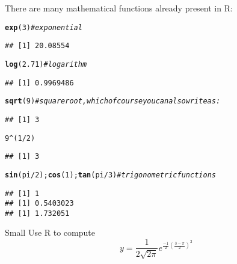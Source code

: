 \documentclass[12pt,a4paper]{scrartcl}\usepackage[]{graphicx}\usepackage[]{color}
\makeatletter
\newcommand{\hlnum}[1]{\textcolor[rgb]{0.686,0.059,0.569}{#1}}%
\newcommand{\hlcom}[1]{\textcolor[rgb]{0.678,0.584,0.686}{\textit{#1}}}%
\newcommand{\hlopt}[1]{\textcolor[rgb]{0,0,0}{#1}}%
\newcommand{\hlstd}[1]{\textcolor[rgb]{0.345,0.345,0.345}{#1}}%
\newcommand{\hlkwd}[1]{\textcolor[rgb]{0.737,0.353,0.396}{\textbf{#1}}}%
\newenvironment{kframe}{%
 \def\at@end@of@kframe{}%
 \ifinner\ifhmode%
  \def\at@end@of@kframe{\end{minipage}}%
  \begin{minipage}{\columnwidth}%
 \fi\fi%
 \def\FrameCommand##1{\hskip\@totalleftmargin \hskip-\fboxsep
 \colorbox{shadecolor}{##1}\hskip-\fboxsep
     \hskip-\linewidth \hskip-\@totalleftmargin \hskip\columnwidth}%
 \MakeFramed {\advance\hsize-\width
   \@totalleftmargin\z@ \linewidth\hsize
   \@setminipage}}%
 {\par\unskip\endMakeFramed%
 \at@end@of@kframe}
\newenvironment{knitrout}{}{} %
\makeatother
\begin{document}
There are many mathematical functions already present in R:
\begin{knitrout}
\color{fgcolor}\begin{kframe}
\begin{alltt}
\hlkwd{exp}\hlstd{(}\hlnum{3}\hlstd{)} \hlcom{#exponential}
\end{alltt}
\begin{verbatim}
## [1] 20.08554
\end{verbatim}
\begin{alltt}
\hlkwd{log}\hlstd{(}\hlnum{2.71}\hlstd{)} \hlcom{#logarithm}
\end{alltt}
\begin{verbatim}
## [1] 0.9969486
\end{verbatim}
\begin{alltt}
\hlkwd{sqrt}\hlstd{(}\hlnum{9}\hlstd{)} \hlcom{#square root, which of course you can also write as:}
\end{alltt}
\begin{verbatim}
## [1] 3
\end{verbatim}
\begin{alltt}
\hlnum{9} \hlopt{^} \hlstd{(}\hlnum{1}\hlopt{/}\hlnum{2}\hlstd{)}
\end{alltt}
\begin{verbatim}
## [1] 3
\end{verbatim}
\begin{alltt}
\hlkwd{sin}\hlstd{(pi}\hlopt{/}\hlnum{2}\hlstd{);} \hlkwd{cos}\hlstd{(}\hlnum{1}\hlstd{);} \hlkwd{tan}\hlstd{(pi}\hlopt{/}\hlnum{3}\hlstd{)} \hlcom{#trigonometric functions}
\end{alltt}
\begin{verbatim}
## [1] 1
## [1] 0.5403023
## [1] 1.732051
\end{verbatim}
\end{kframe}
\end{knitrout}

\begin{mdframed}{Small}
Use R to compute
$$
  y = \frac{1}{2\sqrt{2\pi}} e^{\frac{-1}{2} (\frac{3-\pi}{2})^2}
$$



\end{mdframed}
\end{document}

